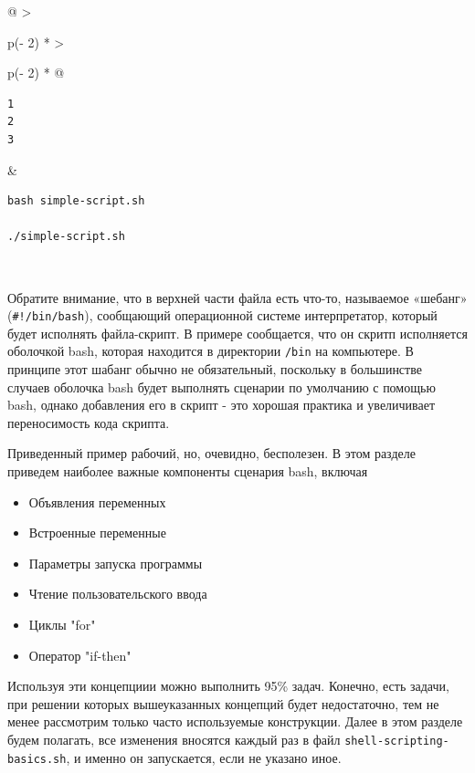 \documentclass{article}
\begin{document}
\begin{longtable}[]{@{}
  >{\raggedright\arraybackslash}p{(\columnwidth - 2\tabcolsep) * }
  >{\raggedright\arraybackslash}p{(\columnwidth - 2\tabcolsep) * }@{}}
\toprule
\endhead
\begin{minipage}[t]{\linewidth}\raggedright
\begin{verbatim}
1
2
3
\end{verbatim}
\end{minipage} & \begin{minipage}[t]{\linewidth}\raggedright
\begin{verbatim}
bash simple-script.sh

./simple-script.sh
\end{verbatim}
\end{minipage} \\ \addlinespace
\bottomrule
\end{longtable}

Обратите внимание, что в верхней части файла есть что-то, называемое
«шебанг» (\texttt{\#!/bin/bash}), сообщающий операционной системе
интерпретатор, который будет исполнять файла-скрипт. В примере
сообщается, что он скритп исполняется оболочкой bash, которая находится
в директории \texttt{/bin} на компьютере. В принципе этот шабанг обычно
не обязательный, поскольку в большинстве случаев оболочка bash будет
выполнять сценарии по умолчанию с помощью bash, однако добавления его в
скрипт - это хорошая практика и увеличивает переносимость кода скрипта.

Приведенный пример рабочий, но, очевидно, бесполезен. В этом разделе
приведем наиболее важные компоненты сценария bash, включая

\begin{itemize}
\tightlist
\item
  Объявления переменных
\item
  Встроенные переменные
\item
  Параметры запуска программы
\item
  Чтение пользовательского ввода
\item
  Циклы "for"
\item
  Оператор "if-then"
\end{itemize}

Используя эти концепциии можно выполнить 95\% задач. Конечно, есть
задачи, при решении которых вышеуказанных концепций будет недостаточно,
тем не менее рассмотрим только часто используемые конструкции. Далее в
этом разделе будем полагать, все изменения вносятся каждый раз в файл
\texttt{shell-scripting-basics.sh}, и именно он запускается, если не
указано иное.
\end{document}
